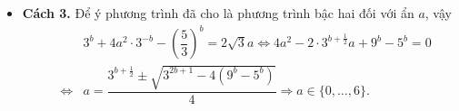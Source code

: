 \begin{ex}
{\begin{itemize}
\begin{eqnarray*}
			\end{eqnarray*}
			Ta cần thử lại
			\begin{itemize}
				\item Nếu 
				\allowdisplaybreaks
				\begin{eqnarray*}
					a \in\{-6, \ldots,-1\} &\Rightarrow&\left(3^b+\sqrt{3}\right)^2 \leq\left(3^b-\sqrt{3} a\right)^2=5^b-a^2 \leq 5^b-1.\\
					&&		4 a^2-2 a \cdot 3^{b+\frac{1}{2}}+9^b-5^b \geq 9^b-5^b+2.3^{b+\frac{1}{2}}+4 \\&\Rightarrow& 9^b-5^b+2\cdot 3^{b+\frac{1}{2}}+4 \leq 0.
				\end{eqnarray*}
				Điều này vô lí vì với $b<0 \Rightarrow V T>4-5^b>3>0$ và với $b \geq 0 \Rightarrow V T>9^b-5^b \geq 0$
				\item Nếu $a \in\{0, \ldots, 6\}$ thử trực tiếp (SHIFT SOLVE) nhận. 
			\end{itemize}
			\item \textbf{Cách 3.} Để ý phương trình đã cho là phương trình bậc hai đối với ẩn $a$, vậy
			\allowdisplaybreaks
			\begin{eqnarray*} 
				&&3^b+4 a^2 \cdot 3^{-b}-\left(\dfrac{5}{3}\right)^b=2 \sqrt{3} a \Leftrightarrow 4 a^2-2\cdot 3^{b+\frac{1}{2}} a+9^b-5^b=0 \\
				& \Leftrightarrow& a=\dfrac{3^{b+\frac{1}{2}} \pm \sqrt{3^{2 b+1}-4\left(9^b-5^b\right)}}{4} \Rightarrow a \in\{0, \ldots, 6\}.
			\end{eqnarray*}
		\end{itemize}
	} 
\end{ex}



